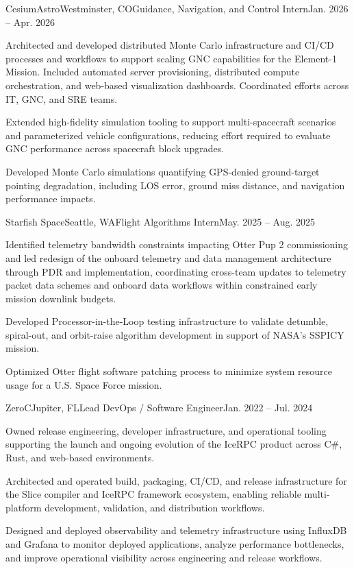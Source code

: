 \documentclass{techresume}
\begin{document}
\begin{job}{CesiumAstro}{Westminster, CO}{Guidance, Navigation, and Control Intern}{Jan. 2026 -- Apr. 2026}
  \item Architected and developed distributed Monte Carlo infrastructure and CI/CD processes and workflows to support scaling GNC capabilities for the Element-1 Mission. Included automated server provisioning, distributed compute orchestration, and web-based visualization dashboards. Coordinated efforts across IT, GNC, and SRE teams.
  \item Extended high-fidelity simulation tooling to support multi-spacecraft scenarios and parameterized vehicle configurations, reducing effort required to evaluate GNC performance across spacecraft block upgrades.
  \item Developed Monte Carlo simulations quantifying GPS-denied ground-target pointing degradation, including LOS error, ground miss distance, and navigation performance impacts.
\end{job}

\begin{job}{Starfish Space}{Seattle, WA}{Flight Algorithms Intern}{May. 2025 -- Aug. 2025}
  \item Identified telemetry bandwidth constraints impacting Otter Pup 2 commissioning and led redesign of the onboard telemetry and data management architecture through PDR and implementation, coordinating cross-team updates to telemetry packet data schemes and onboard data workflows within constrained early mission downlink budgets.
  \item Developed Processor-in-the-Loop testing infrastructure to validate detumble, spiral-out, and orbit-raise algorithm development in support of NASA's SSPICY mission.
  \item Optimized Otter flight software patching process to minimize system resource usage for a U.S. Space Force mission.
\end{job}

\begin{job}{ZeroC}{Jupiter, FL}{Lead DevOps / Software Engineer}{Jan. 2022 -- Jul. 2024}
  \item Owned release engineering, developer infrastructure, and operational tooling supporting the launch and ongoing evolution of the IceRPC product across C\#, Rust, and web-based environments.
  \item Architected and operated build, packaging, CI/CD, and release infrastructure for the Slice compiler and IceRPC framework ecosystem, enabling reliable multi-platform development, validation, and distribution workflows.
  \item Designed and deployed observability and telemetry infrastructure using InfluxDB and Grafana to monitor deployed applications, analyze performance bottlenecks, and improve operational visibility across engineering and release workflows.
\end{job}
\end{document}
